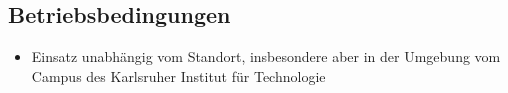 \subsection{Betriebsbedingungen}

\begin{itemize}
	\item Einsatz unabhängig vom Standort, insbesondere aber in der Umgebung vom Campus des Karlsruher Institut für Technologie
\end{itemize}